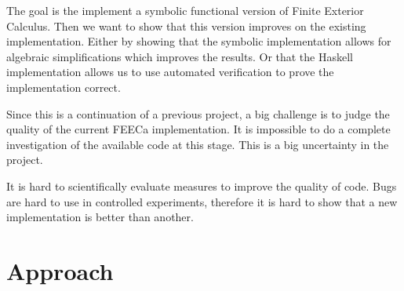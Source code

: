 \documentclass{scrartcl}
\begin{document}
The goal is the implement a symbolic functional version of Finite Exterior
Calculus.  Then we want to show that this version improves on the existing
implementation.  Either by showing that the symbolic implementation allows for
algebraic simplifications which improves the results. Or that the Haskell
implementation allows us to use automated verification to prove the
implementation correct.




Since this is a continuation of a previous project, a big challenge is to judge the quality
of the current FEECa implementation.
It is impossible to do a complete investigation of the available code at this stage.
This is a big uncertainty in the project.

It is hard to scientifically evaluate measures to improve the quality of code.
Bugs are hard to use in controlled experiments, therefore it is hard to show
that a new implementation is better than another.



\section{Approach}


\end{document}
